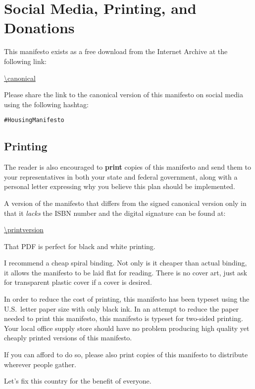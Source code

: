 \section{Social Media, Printing, and Donations}

This manifesto exists as a free download from the Internet Archive at the following link:

\bigskip

\url{\canonical}

\bigskip

Please share the link to the canonical version of this manifesto on social media using the following hashtag:

\bigskip

\texttt{\#HousingManifesto}

\subsection{Printing}

The reader is also encouraged to \textbf{print} copies of this manifesto and send them to your representatives in both your state and federal government, along with a personal letter expressing why you believe this plan should be implemented.

A version of the manifesto that differs from the signed canonical version only in that it \emph{lacks} the ISBN number and the digital signature can be found at:

\bigskip

\url{\printversion}

\bigskip

That PDF is perfect for black and white printing.

I recommend a cheap spiral binding. Not only is it cheaper than actual binding, it allows the manifesto to be laid flat for reading. There is no cover art, just ask for transparent plastic cover if a cover is desired.

In order to reduce the cost of printing, this manifesto has been typeset using the U.S.\ letter paper size with only black ink. In an attempt to reduce the paper needed to print this manifesto, this manifesto is typeset for two-sided printing. Your local office supply store should have no problem producing high quality yet cheaply printed versions of this manifesto.

If you can afford to do so, please also print copies of this manifesto to distribute wherever people gather.

Let's fix this country for the benefit of everyone.

